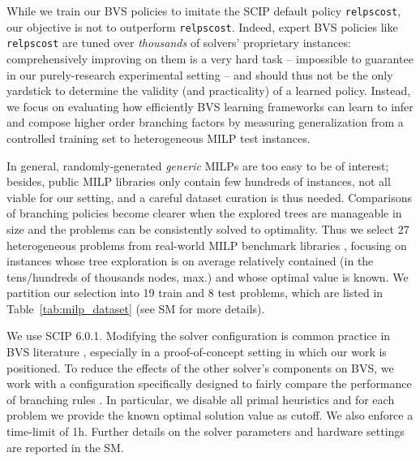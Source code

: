 \documentclass[letterpaper]{article} %
\begin{document}
While we train our BVS policies to imitate the SCIP default policy \texttt{relpscost}, our objective is not to outperform \texttt{relpscost}.
Indeed, expert BVS policies like \texttt{relpscost} are tuned over \emph{thousands} of solvers' proprietary instances: comprehensively improving on them is a very hard task -- impossible to guarantee in our purely-research experimental setting -- and should thus not be the only yardstick to determine the validity (and practicality) of a learned policy.
Instead, we focus on evaluating how efficiently BVS learning frameworks can learn to infer and compose higher order branching factors by measuring generalization from a controlled training set to heterogeneous MILP test instances.

{
In general, randomly-generated \emph{generic} MILPs are too easy to be of interest; besides, public MILP libraries only contain few hundreds of instances, not all viable for our setting, and a careful dataset curation is thus needed.
Comparisons of branching policies become clearer when the explored trees are manageable in size and the problems can be consistently solved to optimality.
Thus we select 27 heterogeneous problems from real-world MILP benchmark libraries \cite{miplib3,MIPLIB2010,miplib2017,milplib}, focusing on instances whose tree exploration is on average relatively contained (in the tens/hundreds of thousands nodes, max.) and whose optimal value is known.
We partition our selection into 19 train and 8 test problems, which are listed in Table~\ref{tab:milp_dataset} (see SM for more details).

We use SCIP 6.0.1.
Modifying the solver configuration is common practice in BVS literature \cite{LinderothSavelsbergh}, especially in a proof-of-concept setting in which our work is positioned.
To reduce the effects of the other solver's components on BVS, we work with a configuration specifically designed to fairly compare the performance of branching rules \cite{gamrath_impact}.
In particular, we disable all primal heuristics and for each problem we provide the known optimal solution value as cutoff.
We also enforce a time-limit of 1h.
Further details on the solver parameters and hardware settings are reported in the SM.
}
\end{document}
